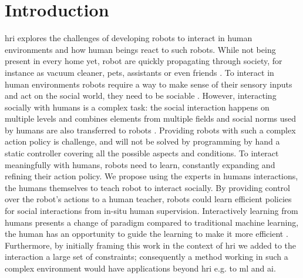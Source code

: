 \chapter{Introduction} \label{chap:intro}
\graphicspath{{images/intro/}}


\gls{hri} explores the challenges of developing robots to interact in human environments and how human beings react to such robots. While not being present in every home yet, robot are quickly propagating through society, for instance as vacuum cleaner, pets, assistants or even friends \cite{belpaeme2012multimodal}. 
To interact in human environments robots require a way to make sense of their sensory inputs and act on the social world, they need to be sociable \citep{breazeal2004designing}. However, interacting socially with humans is a complex task: the social interaction happens on multiple levels and combines elements from multiple fields \citep{fong2003survey} and social norms used by humans are also transferred to robots \citep{bartneck2004design}. Providing robots with such a complex action policy is challenge, and will not be solved by programming by hand a static controller covering all the possible aspects and conditions. To interact meaningfully with humans, robots need to learn, constantly expanding and refining their action policy. We propose using the experts in humans interactions, the humans themselves to teach robot to interact socially. By providing control over the robot's actions to a human teacher, robots could learn efficient policies for social interactions from in-situ human supervision. Interactively learning from humans presents a change of paradigm compared to traditional machine learning, the human has an opportunity to guide the learning to make it more efficient \citep{feil2005defining,amershi2014power}. Furthermore, by initially framing this work in the context of \gls{hri} we added to the interaction a large set of constraints; consequently a method working in such a complex environment would have applications beyond \gls{hri} e.g. to \gls{ml} and \gls{ai}.


%
%
%

